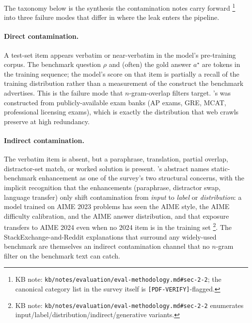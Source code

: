 The taxonomy below is the synthesis the contamination notes carry
forward%
\footnote{KB note: \texttt{kb/notes/evaluation/eval-methodology.md\#sec-2-2}; the canonical category list in the survey itself is \texttt{[PDF-VERIFY]}-flagged. }
into three failure modes that differ in where the leak enters the
pipeline.

\paragraph{Direct contamination.} A test-set item appears verbatim or
near-verbatim in the model's pre-training corpus. The benchmark
question $\rho$ and (often) the gold answer $a^\star$ are tokens in the
training sequence; the model's score on that item is partially a
recall of the training distribution rather than a measurement of the
construct the benchmark advertises. This is the failure mode that
$n$-gram-overlap  filters target. \citet{hendrycks2021-mmlu}'s
 was constructed from publicly-available exam banks (AP exams,
GRE, MCAT, professional licensing exams), which is exactly the
distribution that web crawls preserve at high redundancy.

\paragraph{Indirect contamination.} The verbatim item is absent, but a
paraphrase, translation, partial overlap, distractor-set match, or
worked solution is present. \citet{contamination-survey-2025}'s
abstract names static-benchmark enhancement as one of the survey's
two structural concerns, with the implicit recognition that the
enhancements (paraphrase, distractor swap, language transfer) only
shift contamination from \emph{input} to \emph{label} or
\emph{distribution}: a model trained on AIME 2023 problems has seen
the AIME style, the AIME difficulty calibration, and the AIME answer
distribution, and that exposure transfers to AIME 2024 even when no
2024 item is in the training set%
\footnote{KB note: \texttt{kb/notes/evaluation/eval-methodology.md\#sec-2-2} enumerates input/label/distribution/indirect/generative variants.}.
The StackExchange-and-Reddit explanations that surround any widely-used
benchmark are themselves an indirect contamination channel that no
$n$-gram filter on the benchmark text can catch.

